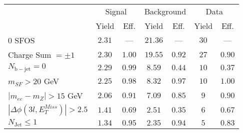 \begin{tabular}{l||c|c||c|c||c|c}
\hline
 &                 \multicolumn{2}{c||}{Signal}            &  \multicolumn{2}{c||}{Background} &  \multicolumn{2}{c}{Data} \\
  & Yield & Eff. & Yield & Eff. & Yield & Eff.\\
  \hline\hline
  0 SFOS &  $2.31$ &  --- &  $21.36$ &  --- & $30$ &  ---\\ 
  \hline
  Charge Sum $= \pm 1$ &  $2.30$ &  $1.00$ &  $19.55$ &  $0.92$ & $27$ &  $0.90$\\ 
  \hline
  $N_{\mathrm{b-jet}} = 0$ &  $2.29$ &  $0.99$ &  $8.59$ &  $0.44$ & $10$ &  $0.37$\\ 
  \hline
  $m_{SF} > 20$ GeV &  $2.25$ &  $0.98$ &  $8.32$ &  $0.97$ & $10$ &  $1.00$\\ 
  \hline
  $|m_{ee} - m_{Z}| > 15$ GeV &  $2.06$ &  $0.91$ &  $7.09$ &  $0.85$ & $9$ &  $0.90$\\ 
  \hline
  $|\Delta\phi(3l,E_{T}^{Miss})| > 2.5$ &  $1.41$ &  $0.69$ &  $2.51$ &  $0.35$ & $6$ &  $0.67$\\ 
  \hline
  $N_{\mathrm{Jet}} \leq 1$ &  $1.34$ &  $0.95$ &  $2.35$ &  $0.94$ & $5$ &  $0.83$\\ 
  \hline
  \end{tabular}

